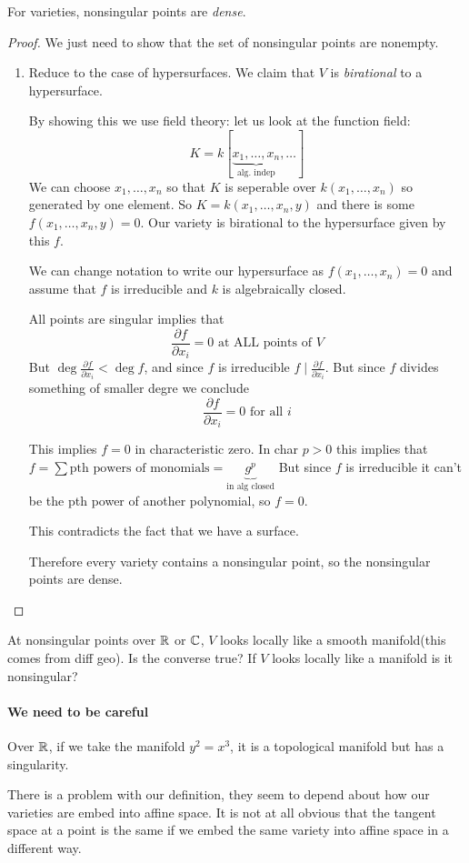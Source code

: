 \begin{theorem}
    For varieties, nonsingular points are \textit{dense}.
    \begin{proof}
       We just need to show that the set of nonsingular points are nonempty.
    \begin{enumerate}[label = (\roman*)]
        \item Reduce to the case of hypersurfaces. We claim that $V$ is \textit{birational} to a hypersurface.
        
        By showing this we use field theory: let us look at the function field:
        \[K = k[\underbrace{x_1,\ldots,x_n}_{\text{alg. indep}},\ldots]\]
    We can choose $x_1,\ldots,x_n$ so that $K$ is seperable over $k(x_1,\ldots,x_n)$ so generated by one element. So $K = k(x_1,\ldots,x_n,y)$ and there is some $f(x_1,\ldots,x_n,y) = 0$. Our variety is birational to the hypersurface given by this $f$.


    We can change notation to write our hypersurface as $f(x_1,\ldots,x_n) = 0$ and assume that $f$ is irreducible and $k$ is algebraically closed.

    All points are singular implies that \[\frac{\partial f}{\partial x_i} = 0 \text{ at ALL points of }V\]
    But $\deg \frac{\partial f}{\partial x_i}<\deg f$, and since $f$ is irreducible $f\mid \frac{\partial f}{\partial x_i}$. But since $f$ divides something of smaller degre we conclude \[\frac{\partial f}{\partial x_i} = 0 \text{ for all }i\]

    This implies $f = 0$ in characteristic zero. In char $p>0$ this implies that $f = \sum \text{pth powers of monomials} = \underbrace{g^p}_{\text{in alg closed}}$
But since $f$ is irreducible it can't be the pth power of another polynomial, so $f=0$.

This contradicts the fact that we have a surface.

Therefore every variety contains a nonsingular point, so the nonsingular points are dense.
\end{enumerate}
    \end{proof}
\end{theorem}
\begin{remark}
    At nonsingular points over $\mathbb{R}$ or $\mathbb{C}$, $V$ looks locally like a smooth manifold(this comes from diff geo). Is the converse true? If $V$ looks locally like a manifold is it nonsingular?

    \paragraph*{We need to be careful}\begin{example}
        Over $\mathbb{R}$, if we take the manifold $y^2=x^3$, it is a topological manifold but has a singularity.
    \end{example}
\end{remark}
There is a problem with our definition, they seem to depend about how our varieties are embed into affine space. It is not at all obvious that the tangent space at a point is the same if we embed the same variety into affine space in a different way.  
